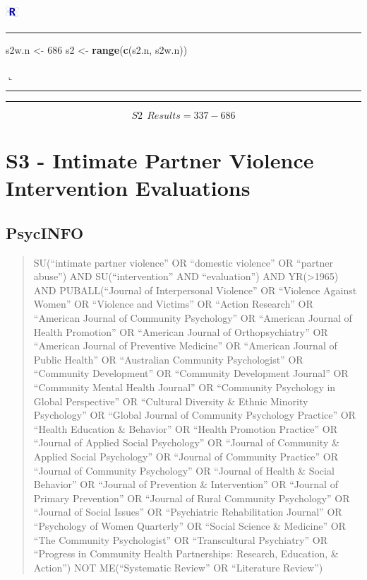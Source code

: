\documentclass[]{tufte-handout}
\newenvironment{Shaded}{}{}
\newcommand{\KeywordTok}[1]{\textbf{{#1}}}
\newcommand{\DecValTok}[1]{{#1}}
\newcommand{\StringTok}[1]{{#1}}
\newcommand{\NormalTok}[1]{{#1}}
\newcommand{\Rrule}{
    \vspace*{1em}
    \noindent
    \hspace{-1em}
    \includegraphics[width=0.5cm]{auxDocs/Rlogo.png}
    \textcolor{Rblue}{
        \rule[0.1in]{0.90\linewidth}{0.02mm}
    }
    \vspace{-1.35em}
}
\newcommand{\Rerule}{
    \noindent
    \hspace{-1em}
    \textcolor{Rblue}{
        $\llcorner$\rule[-0.4mm]{\linewidth}{0.02mm}
    }
}
\begin{document}
\Rrule

\begin{Shaded}
\begin{Highlighting}[]
\NormalTok{s2w.n <-}\StringTok{ }\DecValTok{686}
\NormalTok{s2 <-}\StringTok{ }\KeywordTok{range}\NormalTok{(}\KeywordTok{c}\NormalTok{(s2.n, s2w.n))}
\end{Highlighting}
\end{Shaded}

\Rerule

\begin{center}\rule{0.5\linewidth}{\linethickness}\end{center}

\[ S2~~Results = 337-686 \]

\newpage

\section{S3 - Intimate Partner Violence Intervention
Evaluations}\label{s3---intimate-partner-violence-intervention-evaluations}

\subsection{PsycINFO}\label{psycinfo-2}

\begin{quote}
SU(``intimate partner violence'' OR ``domestic violence'' OR ``partner
abuse'') AND SU(``intervention'' AND ``evaluation'') AND
YR(\textgreater{}1965) AND PUBALL(``Journal of Interpersonal Violence''
OR ``Violence Against Women'' OR ``Violence and Victims'' OR ``Action
Research'' OR ``American Journal of Community Psychology'' OR ``American
Journal of Health Promotion'' OR ``American Journal of Orthopsychiatry''
OR ``American Journal of Preventive Medicine'' OR ``American Journal of
Public Health'' OR ``Australian Community Psychologist'' OR ``Community
Development'' OR ``Community Development Journal'' OR ``Community Mental
Health Journal'' OR ``Community Psychology in Global Perspective'' OR
``Cultural Diversity \& Ethnic Minority Psychology'' OR ``Global Journal
of Community Psychology Practice'' OR ``Health Education \& Behavior''
OR ``Health Promotion Practice'' OR ``Journal of Applied Social
Psychology'' OR ``Journal of Community \& Applied Social Psychology'' OR
``Journal of Community Practice'' OR ``Journal of Community Psychology''
OR ``Journal of Health \& Social Behavior'' OR ``Journal of Prevention
\& Intervention'' OR ``Journal of Primary Prevention'' OR ``Journal of
Rural Community Psychology'' OR ``Journal of Social Issues'' OR
``Psychiatric Rehabilitation Journal'' OR ``Psychology of Women
Quarterly'' OR ``Social Science \& Medicine'' OR ``The Community
Psychologist'' OR ``Transcultural Psychiatry'' OR ``Progress in
Community Health Partnerships: Research, Education, \& Action'') NOT
ME(``Systematic Review'' OR ``Literature Review'')
\end{quote}
\end{document}
